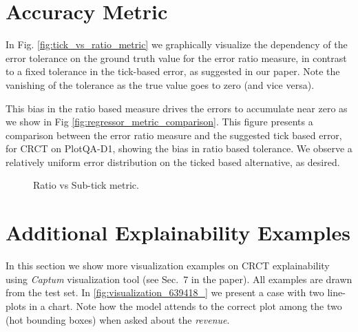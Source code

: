 \documentclass[runningheads]{llncs}
\begin{document}
\section{Accuracy Metric}
\label{sec:acc_metric}
In Fig. \ref{fig:tick_vs_ratio_metric} we graphically visualize the dependency of the error tolerance on the ground truth value for the error ratio measure, in contrast to a fixed tolerance in the tick-based error, as suggested in our paper. Note the vanishing of the tolerance as the true value goes to zero (and vice versa).


This bias in the ratio based measure drives the errors to accumulate near zero as we show in Fig \ref{fig:regressor_metric_comparison}. This figure presents a comparison between the error ratio measure and the suggested tick based error, for CRCT on PlotQA-D1, showing the bias in ratio based tolerance. We observe a relatively uniform error distribution on the ticked based alternative, as desired.  


\begin{figure*}[ht]
  \centering
  \hfill

  \caption{Ratio vs Sub-tick metric.}
\label{fig:ratio_vs_subtick}
\end{figure*}










\section{Additional Explainability Examples}
\label{sec:additional_explainability}
In this section we show more visualization examples on CRCT explainability using {\it Captum} visualization tool (see Sec.~7 in the paper). All examples are drawn from the test set. In \cref{fig:visualization_639418_} we present a case with two line-plots in a chart. Note how the model attends to the correct plot among the two (hot bounding boxes) when asked about the {\it revenue}.
\end{document}
